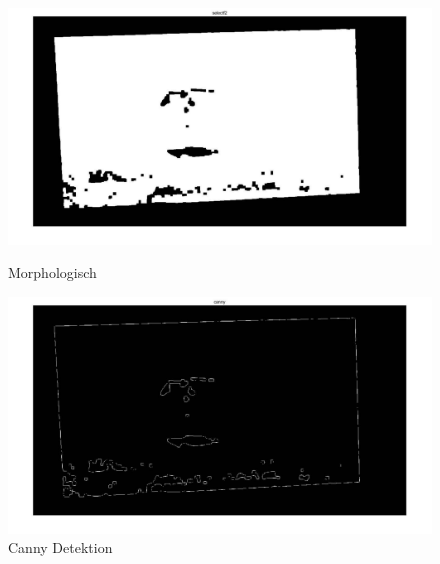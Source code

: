 \begin{figure}[H]
\centering 
\begin{minipage}[b]{0.49\textwidth} 
\centering 
\includegraphics[width=1.0\textwidth]{images/5_Implementirung/2/morpho.pdf} 
\caption{Morphologisch}
\label{fig:morph2}
\end{minipage}
\begin{minipage}[b]{0.49\textwidth} 
\centering 
\includegraphics[width=1.0\textwidth]{images/5_Implementirung/2/canny.pdf}
\caption{Canny Detektion}
\label{fig:canny}
\end{minipage}
\end{figure}

